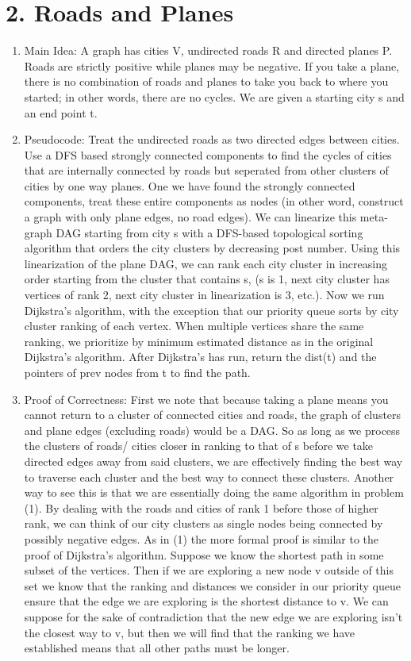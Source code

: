 \documentclass[11pt]{article}
\begin{document}
\newpage
\section*{2. Roads and Planes}
\begin{enumerate}
\item Main Idea: A graph has cities V, undirected roads R and directed planes P. Roads are strictly positive while planes may be negative. If you take a plane, there is no combination of roads and planes to take you back to where you started; in other words, there are no cycles. We are given a starting city s and an end point t.
\item Pseudocode: Treat the undirected roads as two directed edges between cities. Use a DFS based strongly connected components to find the cycles of cities that are internally connected by roads but seperated from other clusters of cities by one way planes. One we have found the strongly connected components, treat these entire components as nodes (in other word, construct a graph with only plane edges, no road edges). We can linearize this meta-graph DAG starting from city s with a DFS-based topological sorting algorithm that orders the city clusters by decreasing post number. Using this linearization of the plane DAG, we can rank each city cluster in increasing order starting from the cluster that contains s, (s is 1, next city cluster has vertices of rank 2, next city cluster in linearization is 3, etc.). Now we run Dijkstra's algorithm, with the exception that our priority queue sorts by city cluster ranking of each vertex. When multiple vertices share the same ranking, we prioritize by minimum estimated distance as in the original Dijkstra's algorithm. After Dijkstra's has run, return the dist(t) and the pointers of prev nodes from t to find the path.
\item Proof of Correctness: First we note that because taking a plane means you cannot return to a cluster of connected cities and roads, the graph of clusters and plane edges (excluding roads) would be a DAG. So as long as we process the clusters of roads/ cities closer in ranking to that of s before we take directed edges away from said clusters, we are effectively finding the best way to traverse each cluster and the best way to connect these clusters. Another way to see this is that we are essentially doing the same algorithm in problem (1). By dealing with the roads and cities of rank 1 before those of higher rank, we can think of our city clusters as single nodes being connected by possibly negative edges. As in (1) the more formal proof is similar to the proof of Dijkstra's algorithm. Suppose we know the shortest path in some subset of the vertices. Then if we are exploring a new node v outside of this set we know that the ranking and distances we consider in our priority queue ensure that the edge we are exploring is the shortest distance to v. We can suppose for the sake of contradiction that the new edge we are exploring isn't the closest way to v, but then we will find that the ranking we have established means that all other paths must be longer.

\end{enumerate}
\end{document}
